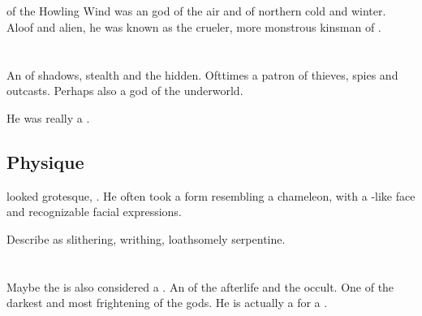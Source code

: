 \section{\Llorgul}
\index{\Llorgul}
\Llorgul of the Howling Wind was an \Ortaican god of the air and of northern cold and winter. 
Aloof and alien, he was known as the crueler, more monstrous kinsman of \Daxian.















\section{\Nasshikerr}
\index{\Nasshikerr}
An  of shadows, stealth and the hidden. 
Ofttimes a patron of thieves, spies and outcasts. 
Perhaps also a god of the underworld.

He was really a \quiljaar. 









\subsection{Physique}
\Nasshikerr looked grotesque, .
He often took a form resembling a chameleon, with a \scatha-like face and recognizable facial expressions. 

Describe \Nasshikerr as slithering, writhing, loathsomely serpentine.















\section{\NerrhanKoss}
\index{\NerrhanKoss}
Maybe  the \xs{} is also considered a . 
An  of the afterlife and the occult. 
One of the darkest and most frightening of the \Ortaican{} gods. 
He is actually a  for a \xs. 















